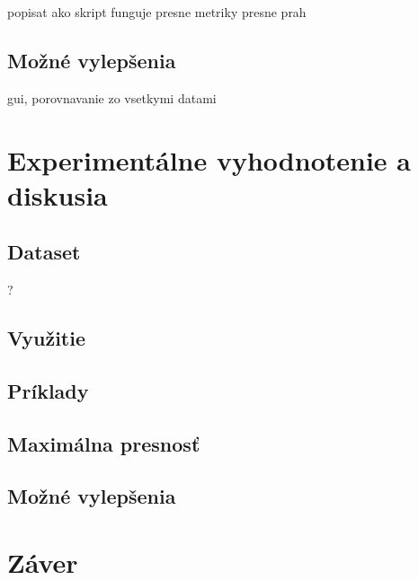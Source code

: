 popisat ako skript funguje
presne metriky
presne prah

\section{Možné vylepšenia}
gui, porovnavanie zo vsetkymi datami

\chapter{Experimentálne vyhodnotenie a diskusia}
\label{experimenty}


\section{Dataset} ?

\section{Využitie}


\section{Príklady}

\section{Maximálna presnosť}

\section{Možné vylepšenia}

\chapter{Záver}
\label{zaver}


